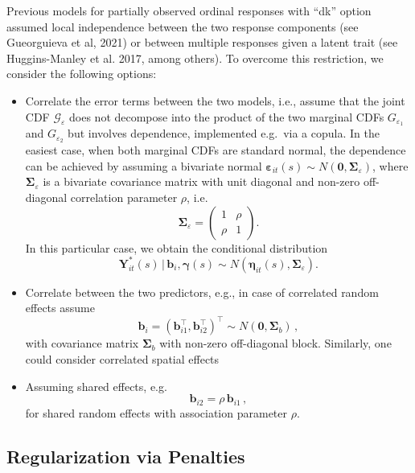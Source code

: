 \documentclass[submit]{smj}
\begin{document}
Previous models for partially observed ordinal responses with \enquote{dk} option assumed local independence between the two response components (see Gueorguieva et al, 2021) or between multiple responses given a latent trait (see Huggins-Manley et al. 2017, among others). To overcome this restriction, we consider the following options:
\begin{itemize}
    \item Correlate the error terms between the two models, i.e., assume that the joint CDF $\mathcal{G}_\varepsilon$ does not decompose into the product of the two marginal CDFs $G_{\varepsilon_1}$ and $G_{\varepsilon_2}$ but involves dependence, implemented e.g.\ via a copula. In the easiest case, when both marginal CDFs are standard normal, the dependence can be achieved by assuming a bivariate normal $\pmb{\varepsilon}_{it}(s)\sim N(\bm{0}, \bm{\Sigma}_\varepsilon)$, where $\bm{\Sigma}_\varepsilon$ is a bivariate covariance matrix with unit diagonal and non-zero off-diagonal correlation parameter $\rho$, i.e.
  \begin{equation}\label{eq:sigma}
    \bm{\Sigma}_\varepsilon = \begin{pmatrix}
        1 & \rho\\
        \rho & 1
    \end{pmatrix}.
    \end{equation}
    In this particular case, we obtain the conditional distribution
    \[
    \pmb{Y}^*_{it}(s)\,|\,\pmb{b}_i,\pmb{\gamma}(s) \sim N( \pmb{\eta}_{it}(s), \bm{\Sigma}_\varepsilon).
    \]
    
    \item Correlate between the two predictors, e.g., in case of correlated random effects assume
    \[
    \bm{b}_i=(\bm{b}_{i1}^{\top},\bm{b}_{i2}^{\top})^{\top} \sim N(\bm{0}, \bm{\Sigma}_b)\,,
    \]
    with covariance matrix $\bm{\Sigma}_b$ with non-zero off-diagonal block. Similarly, one could consider correlated spatial effects
    \item Assuming shared effects, e.g. 
    \[
    \bm{b}_{i2} = \rho\,\bm{b}_{i1}\,,
    \]
    for shared random effects with association parameter $\rho$.
\end{itemize}

\subsection{Regularization via Penalties}\label{subsec:penal}
\end{document}
